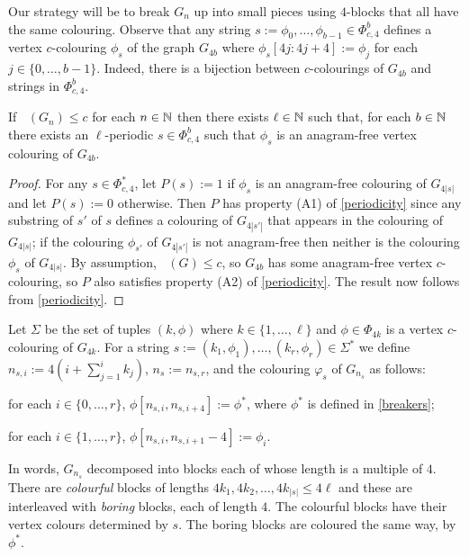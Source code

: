 \documentclass{patmorin}
\DeclareMathOperator{\afcn}{\dot{\chi}_\pi}
\begin{document}
Our strategy will be to break $G_n$ up into small pieces using $4$-blocks that all have the same colouring. Observe that any string $s:=\phi_0,\ldots,\phi_{b-1}\in\Phi_{c,4}^b$ defines a vertex $c$-colouring $\phi_s$ of the graph $G_{4b}$ where $\phi_s[4j\mathbin{:}4j+4]:=\phi_j$ for each $j\in\{0,\ldots,b-1\}$.  Indeed, there is a bijection between $c$-colourings of $G_{4b}$ and strings in $\Phi_{c,4}^b$.

\begin{lem}\label{breakers}
    If $\afcn(G_n)\le c$ for each $n\in\mathbb{N}$ then there exists $\ell\in\mathbb{N}$ such that, for each $b\in\mathbb{N}$ there exists an $\ell$-periodic $s\in\Phi_{c,4}^b$ such that $\phi_s$ is an anagram-free vertex colouring of $G_{4b}$.
\end{lem}

\begin{proof}
    For any $s\in\Phi_{c,4}^*$, let $P(s):=1$ if $\phi_s$ is an anagram-free colouring of $G_{4|s|}$ and let $P(s):=0$ otherwise.  Then $P$ has property (A1) of \cref{periodicity} since any substring of $s'$ of $s$ defines a colouring of $G_{4|s'|}$ that appears in the colouring of $G_{4|s|}$; if the colouring $\phi_{s'}$ of $G_{4|s'|}$ is not anagram-free then neither is the colouring $\phi_s$ of $G_{4|s|}$. By assumption, $\afcn(G)\le c$, so $G_{4b}$ has some anagram-free vertex $c$-colouring, so $P$ also satisfies property (A2) of \cref{periodicity}.  The result now follows from  \cref{periodicity}.
\end{proof}

Let $\Sigma$ be the set of tuples $(k,\phi)$ where $k\in\{1,\ldots,\ell\}$ and $\phi\in\Phi_{4k}$ is a vertex $c$-colouring of $G_{4k}$.  For a string $s:=(k_1,\phi_1),\ldots,(k_r,\phi_r)\in\Sigma^*$ we define $n_{s,i}:=4(i+\sum_{j=1}^i k_j)$, $n_s:=n_{s,r}$, and the colouring $\varphi_s$ of $G_{n_s}$ as follows:
\begin{compactenum}
    \item for each $i\in\{0,\ldots,r\}$, $\phi[n_{s,i},n_{s,i+4}]:=\phi^*$, where $\phi^*$ is defined in \cref{breakers};
    \item for each $i\in\{1,\ldots,r\}$, $\phi[n_{s,i},n_{s,i+1}-4]:=\phi_i$.
\end{compactenum}
In words, $G_{n_s}$ decomposed into blocks each of whose length is a multiple of $4$.  There are \emph{colourful} blocks of lengths $4k_1,4k_2,\ldots,4k_{|s|}\le 4\ell$ and these are interleaved with \emph{boring} blocks, each of length $4$.  The colourful blocks have their vertex colours determined by $s$. The boring blocks are coloured the same way, by $\phi^*$.
\end{document}
